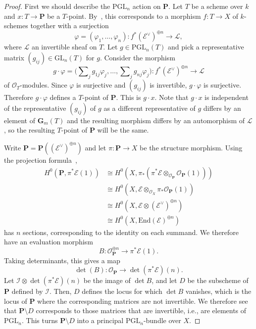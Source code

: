 \begin{proof}
First we should describe the $\mathrm{PGL}_n$ action on $\mathbf{P}$.
Let $T$ be a scheme over $k$ and $x : T \to \mathbf{P}$ be a $T$-point.
By~, this corresponds to a morphism $f : T \to X$ of $k$-schemes
together with a surjection
$$
\varphi = (\varphi_1,\ldots,\varphi_n) :
f^*(\mathcal{E}^\vee)^{\oplus n} \to \mathcal{L},
$$
where $\mathcal{L}$ an invertible sheaf on $T$.
Let $g \in \mathrm{PGL}_n(T)$ and pick a representative matrix
$(g_{ij}) \in \mathrm{GL}_n(T)$ for $g$.
Consider the morphism
$$
g \cdot \varphi =
\big(\sum\nolimits_j g_{1j}\varphi_j,\ldots,\sum\nolimits_j g_{nj}\varphi_j\big)
: f^*(\mathcal{E}^\vee)^{\oplus n} \to \mathcal{L}
$$
of $\mathcal{O}_T$-modules.
Since $\varphi$ is surjective and $(g_{ij})$ is invertible, $g \cdot \varphi$
is surjective.
Therefore $g \cdot \varphi$ defines a $T$-point of $\mathbf{P}$.
This is $g \cdot x$.
Note that $g \cdot x$ is independent of the representative $(g_{ij})$ of $g$
as a different representative of $g$ differs by an element of $\mathbf{G}_m(T)$
and the resulting morphism differs by an automorphism of $\mathcal{L}$, so the
resulting $T$-point of $\mathbf{P}$ will be the same.

Write $\mathbf{P} = \mathbf{P}((\mathcal{E}^\vee)^{\oplus n})$ and let
$\pi : \mathbf{P} \to X$ be the structure morphism.
Using the projection formula~,
\begin{align*}
H^0(\mathbf{P}, \pi^*\mathcal{E}(1))
  & \cong H^0(X, \pi_*(\pi^*\mathcal{E} \otimes_{\mathcal{O}_{\mathbf{P}}}
      \mathcal{O}_{\mathbf{P}}(1))) \\
  & \cong H^0(X,\mathcal{E} \otimes_{\mathcal{O}_X}
      \pi_*\mathcal{O}_{\mathbf{P}}(1)) \\
  & \cong H^0(X,\mathcal{E} \otimes (\mathcal{E}^\vee)^{\oplus n}) \\
  & \cong H^0(X,\mathrm{End}(\mathcal{E})^{\oplus n})
\end{align*}
has $n$ sections, corresponding to the identity on each summand.
We therefore have an evaluation morphism
$$
B : \mathcal{O}_{\mathbf{P}}^{\oplus n} \longrightarrow \pi^*\mathcal{E}(1).
$$
Taking determinants, this gives a map
$$
\det(B) : \mathcal{O}_{\mathbf{P}} \longrightarrow \det(\pi^*\mathcal{E})(n).
$$
Let $\mathcal{I} \otimes \det(\pi^*\mathcal{E}) (n)$ be the image of $\det B$,
and let $D$ be the subscheme of $\mathbf{P}$ defined by $\mathcal{I}$.
Then, $D$ defines the locus for which $\det B$ vanishes, which is the locus of
$\mathbf{P}$ where the corresponding matrices are not invertible.
We therefore see that $\mathbf{P} \setminus D$ corresponds to those matrices
that are invertible, i.e., are elements of $\mathrm{PGL}_n$.
This turns $\mathbf{P} \setminus D$ into a principal $\mathrm{PGL}_n$-bundle
over $X$.


\end{proof}

